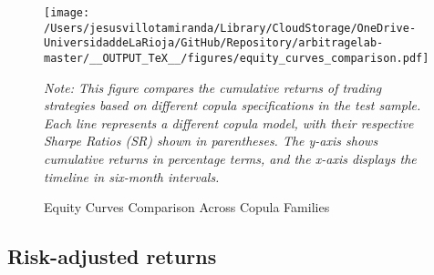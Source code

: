 \begin{figure}[H]
  \caption{Equity Curves Comparison Across Copula Families}
  \centering
  \texttt{[image: /Users/jesusvillotamiranda/Library/CloudStorage/OneDrive-UniversidaddeLaRioja/GitHub/Repository/arbitragelab-master/\_\_OUTPUT\_TeX\_\_/figures/equity\_curves\_comparison.pdf]}
  \label{fig:equity_curves_comparison}
\vspace{0.5cm}
\begin{minipage}{\textwidth}
\setlength{\parindent}{0pt}
\small\textit{Note: 
This figure compares the cumulative returns of trading strategies based on different copula specifications in the test sample. Each line represents a different copula model, with their respective Sharpe Ratios (SR) shown in parentheses. The y-axis shows cumulative returns in percentage terms, and the x-axis displays the timeline in six-month intervals.
}
\end{minipage}

\end{figure}




\subsection{Risk-adjusted returns}

